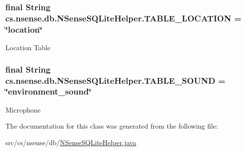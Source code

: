 \hypertarget{classcs_1_1nsense_1_1db_1_1_n_sense_s_q_lite_helper_aa965679492becc56e3848f41083401f5}{
\subsubsection[{T\-A\-B\-L\-E\-\_\-\-L\-O\-C\-A\-T\-I\-O\-N}]{\setlength{\rightskip}{0pt plus 5cm}final String cs.\-nsense.\-db.\-N\-Sense\-S\-Q\-Lite\-Helper.\-T\-A\-B\-L\-E\-\_\-\-L\-O\-C\-A\-T\-I\-O\-N = \char`\"{}location\char`\"{}\hspace{0.3cm}{\ttfamily [static]}}}\label{classcs_1_1nsense_1_1db_1_1_n_sense_s_q_lite_helper_aa965679492becc56e3848f41083401f5}
Location Table \hypertarget{classcs_1_1nsense_1_1db_1_1_n_sense_s_q_lite_helper_a65318f615866f1180c84e186fa05641a}{
\subsubsection[{T\-A\-B\-L\-E\-\_\-\-S\-O\-U\-N\-D}]{\setlength{\rightskip}{0pt plus 5cm}final String cs.\-nsense.\-db.\-N\-Sense\-S\-Q\-Lite\-Helper.\-T\-A\-B\-L\-E\-\_\-\-S\-O\-U\-N\-D = \char`\"{}environment\-\_\-sound\char`\"{}\hspace{0.3cm}{\ttfamily [static]}}}\label{classcs_1_1nsense_1_1db_1_1_n_sense_s_q_lite_helper_a65318f615866f1180c84e186fa05641a}
Microphone 

The documentation for this class was generated from the following file\-:\begin{DoxyCompactItemize}
\item 
src/cs/nsense/db/\hyperlink{_n_sense_s_q_lite_helper_8java}{N\-Sense\-S\-Q\-Lite\-Helper.\-java}\end{DoxyCompactItemize}
